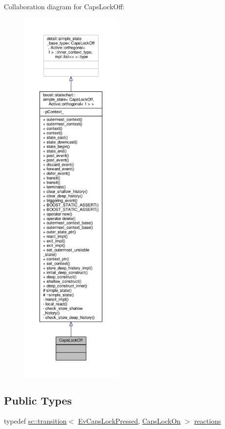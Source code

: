 Collaboration diagram for Caps\+Lock\+Off\+:
\nopagebreak
\begin{figure}[H]
\begin{center}
\leavevmode
\includegraphics[height=550pt]{struct_caps_lock_off__coll__graph}
\end{center}
\end{figure}
\subsection*{Public Types}
\begin{DoxyCompactItemize}
\item 
typedef \mbox{\hyperlink{classboost_1_1statechart_1_1transition}{sc\+::transition}}$<$ \mbox{\hyperlink{struct_ev_caps_lock_pressed}{Ev\+Caps\+Lock\+Pressed}}, \mbox{\hyperlink{struct_caps_lock_on}{Caps\+Lock\+On}} $>$ \mbox{\hyperlink{struct_caps_lock_off_a22aac8608f02e93d4f240e2c1f038b22}{reactions}}
\end{DoxyCompactItemize}
